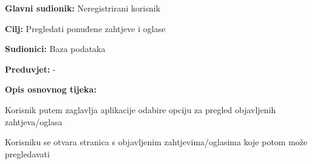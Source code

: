 					\noindent {}
					\begin{packed_item}
	
						\item \textbf{Glavni sudionik: } Neregistrirani korisnik 
						\item  \textbf{Cilj:} Pregledati ponuđene zahtjeve i oglase
						\item  \textbf{Sudionici:} Baza podataka 
						\item  \textbf{Preduvjet:} -
						\item  \textbf{Opis osnovnog tijeka:}
						
						\item[] \begin{packed_enum}
	
							\item Korisnik putem zaglavlja aplikacije odabire opciju za pregled objavljenih zahtjeva/oglasa
							\item Korisniku se otvara stranica s objavljenim zahtjevima/oglasima koje potom može pregledavati
				
						\end{packed_enum}
					\end{packed_item}
					
